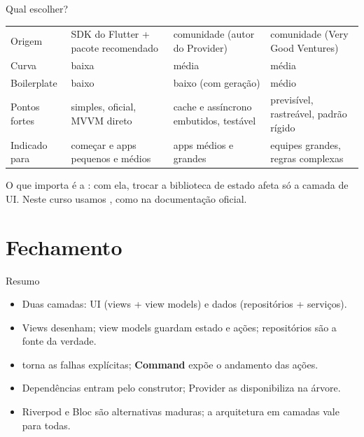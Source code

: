 \documentclass[aspectratio=169,10pt]{beamer}
\begin{document}
\begin{frame}{Qual escolher?}
  \footnotesize
  \begin{tabularx}{\textwidth}{@{}l L L L@{}}
    \toprule
    &  &  &  \\
    \midrule
    Origem & SDK do Flutter + pacote recomendado & comunidade (autor do Provider) & comunidade (Very Good Ventures) \\
    Curva & baixa & média & média \\
    Boilerplate & baixo & baixo (com geração) & médio \\
    Pontos fortes & simples, oficial, MVVM direto & cache e assíncrono embutidos, testável & previsível, rastreável, padrão rígido \\
    Indicado para & começar e apps pequenos e médios & apps médios e grandes & equipes grandes, regras complexas \\
    \bottomrule
  \end{tabularx}
  \vspace{4pt}
  \begin{caixaambar}
    O que importa é a : com ela, trocar a biblioteca de estado afeta só a camada de UI. Neste curso usamos , como na documentação oficial.
  \end{caixaambar}
\end{frame}

\section{Fechamento}

\begin{frame}{Resumo}
  \begin{resumo}
    \begin{itemize}
      \item Duas camadas: UI (views + view models) e dados (repositórios + serviços).
      \item Views desenham; view models guardam estado e ações; repositórios são a fonte da verdade.
      \item {} torna as falhas explícitas; \textbf{Command} expõe o andamento das ações.
      \item Dependências entram pelo construtor; Provider as disponibiliza na árvore.
      \item Riverpod e Bloc são alternativas maduras; a arquitetura em camadas vale para todas.
    \end{itemize}
  \end{resumo}
\end{frame}
\end{document}

